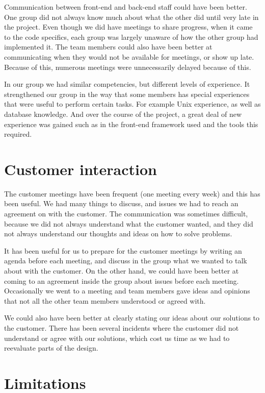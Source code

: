 Communication between front-end and back-end staff could have been better. One group did not always know much about what the other did until very late in the project. Even though we did have meetings to share progress, when it came to the code specifics, each group was largely unaware of how the other group had implemented it. The team members could also have been better at communicating when they would not be available for meetings, or show up late. Because of this, numerous meetings were unnecessarily delayed because of this.\newline

In our group we had similar competencies, but different levels of experience. It strengthened our group in the way that some members has special experiences that were useful to perform certain tasks. For example Unix experience, as well as database knowledge. And over the course of the project, a great deal of new experience was gained such as in the front-end framework used and the tools this required.

\section{Customer interaction}

The customer meetings have been frequent (one meeting every week) and this has been useful. We had many things to discuss, and issues we had to reach an agreement on with the customer. The communication was sometimes difficult, because we did not always understand what the customer wanted, and they did not always understand our thoughts and ideas on how to solve problems.\newline

It has been useful for us to prepare for the customer meetings by writing an agenda before each meeting, and discuss in the group what we wanted to talk about with the customer. On the other hand, we could have been better at coming to an agreement inside the group about issues before each meeting. Occasionally we went to a meeting and team members gave ideas and opinions that not all the other team members understood or agreed with.\newline

We could also have been better at clearly stating our ideas about our solutions to the customer.  There has been several incidents where the customer did not understand or agree with our solutions, which cost us time as we had to reevaluate parts of the design.

\section{Limitations}


